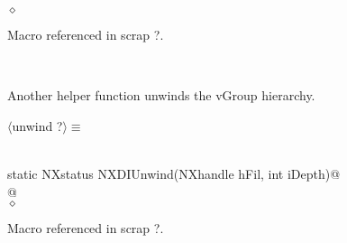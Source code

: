 \documentclass[12pt]{article}
\begin{document}
{\begin{flushleft}
\begin{minipage}{\linewidth}
\begin{list}{}{}
\mbox{}\verb@@$\diamond$
\end{list}
\vspace{-1ex}
\footnotesize\addtolength{\baselineskip}{-1ex}
\begin{list}{}{\setlength{\itemsep}{-\parsep}\setlength{\itemindent}{-\leftmargin}}
\item Macro referenced in scrap ?.
\end{list}
\end{minipage}\\[4ex]
\end{flushleft}
Another helper function unwinds the vGroup hierarchy.
\begin{flushleft} \small
\begin{minipage}{\linewidth} \label{scrap28}
$\langle$unwind {\footnotesize ?}$\rangle\equiv$
\vspace{-1ex}
\begin{list}{}{} \item
\mbox{}\verb@@\\
\mbox{}\verb@  static NXstatus NXDIUnwind(NXhandle hFil, int iDepth)@\\
\mbox{}@\\
\mbox{}\verb@@$\diamond$
\end{list}
\vspace{-1ex}
\footnotesize\addtolength{\baselineskip}{-1ex}
\begin{list}{}{\setlength{\itemsep}{-\parsep}\setlength{\itemindent}{-\leftmargin}}
\item Macro referenced in scrap ?.
\end{list}
\end{minipage}\\[4ex]
\end{flushleft}
}
\end{document}
